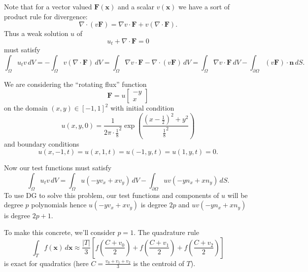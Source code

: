\documentclass[letterpaper,10pt]{article}
\begin{document}
Note that for a vector valued \(\mathbf{F}\left(\mathbf{x}\right)\) and
a scalar \(v\left(\mathbf{x}\right)\) we have a sort of product rule for
divergence:
\[\nabla \cdot \left(v\mathbf{F}\right) = \nabla v \cdot \mathbf{F} +
v \left(\nabla \cdot \mathbf{F}\right).\]
Thus a weak solution \(u\) of
\[u_t + \nabla \cdot \mathbf{F} = 0\]
must satisfy
\[\int_{\Omega} u_t v \, dV =
-\int_{\Omega} v \left(\nabla \cdot \mathbf{F}\right) \, dV =
\int_{\Omega} \nabla v \cdot \mathbf{F} -
\nabla \cdot \left(v\mathbf{F}\right) \, dV =
\int_{\Omega} \nabla v \cdot \mathbf{F} \, dV -
\int_{\partial \Omega} \left(v\mathbf{F}\right) \cdot \mathbf{n} \, dS.\]

We are considering the ``rotating flux'' function
\[\mathbf{F} = u \left[ \begin{array}{c} -y \\ x
\end{array}\right]\]
on the domain \((x, y) \in \left[-1, 1\right]^2\) with initial
condition
\[u(x, y, 0) = \frac{1}{2\pi \cdot \frac{1}{8}^2} \exp\left(
\frac{\left(x - \frac{1}{2}\right)^2 + y^2}{\frac{1}{8}^2}\right)\]
and boundary conditions
\[u(x, -1, t) = u(x, 1, t) = u(-1, y, t) = u(1, y, t) = 0.\]

Now our test functions must satisfy
\[\int_{\Omega} u_t v \, dV =
\int_{\Omega} u\left(-y v_x + x v_y\right) \, dV -
\int_{\partial \Omega} uv \left(-y n_x + x n_y\right) \, dS.\]
To use DG to solve this problem, our test functions and components
of \(u\) will be degree \(p\) polynomials hence
\(u\left(-y v_x + x v_y\right)\) is degree \(2p\) and
\(uv \left(-y n_x + x n_y\right)\) is degree \(2p + 1\).

To make this concrete, we'll consider \(p = 1\). The quadrature
rule
\[\int_T f\left(\mathbf{x}\right) \, d\mathbf{x} \approx
\frac{\left|T\right|}{3}
\left[f\left(\frac{C + v_0}{2}\right) +
f\left(\frac{C + v_1}{2}\right) +
f\left(\frac{C + v_2}{2}\right)\right]\]
is exact for quadratics (here \(C = \frac{v_0 + v_1 + v_2}{3}\) is
the centroid of \(T\)).
\end{document}
